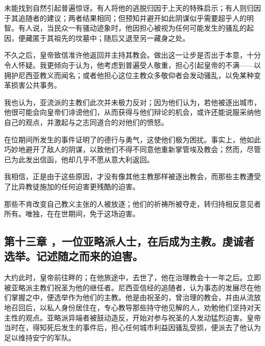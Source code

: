 未能找到自然引起普遍惊讶。有人将他的逃脱归因于上天的特殊启示；有人则归因于其追随者的建议；两者结果相同；但预知并避开如此阴谋似乎需要超乎人的明智。有人说，当民众一有骚动迹象时，他因担心被视为任何可能发生的骚乱的起因，便藏匿于其祖先的坟墓中；随后又退至另一藏身之处。\par

不久之后，皇帝致信准许他返回并主持其教会。做出这一让步是否出于本意，十分令人怀疑。我更倾向于认为，他考虑到普遍受人敬重，担心引起皇帝的不满——以拥护尼西亚教义而闻名；或者他担心这位主教众多敬仰者会发动骚乱，以免某种变革损害公共事务。\par

我也认为，亚流派的主教们此次并未极力反对；因为他们认为，若他被逐出城市，他很可能会向皇帝们诽谤他们，从而获得与他们辩论的机会，或许还能说服采纳他自己的观点，并激起与之志同道合的对他们的愤怒。\par

在位期间所发生的事件证明了的德行与勇气，这使他们极为困扰。事实上，他如此巧妙地避开了敌人的阴谋，以致他们不得不同意他重新掌管埃及教会；然而，尽管已为此发出信函，他却几乎不愿从意大利返回。\par

我相信，正是由于这些原因，才没有像其他主教那样被逐出教会，而那些主教遭受了比异教徒施加的任何迫害更残酷的迫害。\par

那些不肯改变自己教义主张的人被放逐；他们的祈祷所被夺走，转归持相反意见者所有。唯独，在在世期间，免于这场迫害。\par


\subsection{第十三章 ，一位亚略派人士，在后成为主教。虔诚者选举。记述随之而来的迫害。}

大约此时，皇帝前往畔的；在他旅途中，去世了，他在治理教会十一年之后。立即被亚略派主教们祝圣为他的继任者。尼西亚信经的追随者，认为事态的发展尽在他们掌握之中，便选举作为他们的主教。他是由祝圣的，曾治理的教会，并由从流放地召回后，以私人身份居住在，专心教导那些持守他见解的人，劝勉他们坚持对天主性的观点。亚略派异端者被鼓动造反，开始对参与祝圣的人发动猛烈迫害。皇帝当时在，得知死后发生的事件后，担心任何城市利益因骚乱受损，便派去了他认为足以维持安宁的军队。\par

